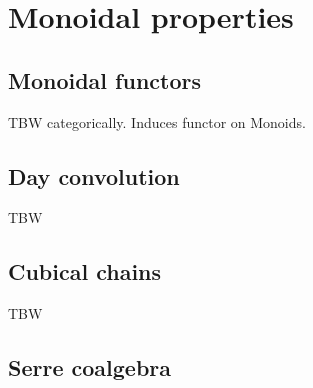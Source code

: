 
\section{Monoidal properties}

\subsection{Monoidal functors}

TBW categorically. Induces functor on Monoids.

\subsection{Day convolution}

TBW

\subsection{Cubical chains}

TBW


\subsection{Serre coalgebra}


